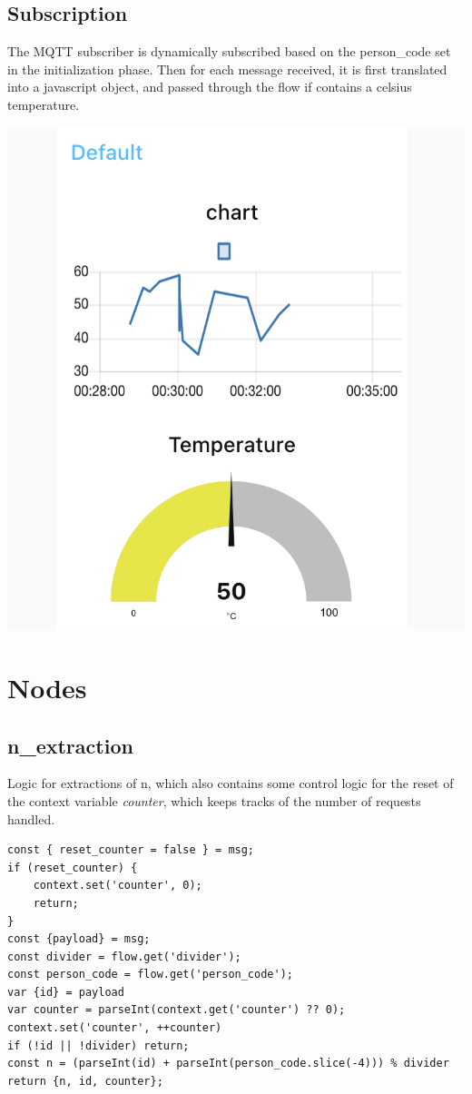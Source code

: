 \documentclass[12pt,a4paper]{article}
\begin{document}
\subsection*{Subscription}
The MQTT subscriber is dynamically subscribed based on the person\_code set in the initialization phase.
Then for each message received, it is first translated into a javascript object, and passed through the 
flow if contains a celsius temperature.

\begin{center}
    \includegraphics*[scale = 0.6]{images/chart.png}
\end{center}



\section*{Nodes}
\subsection*{n\_extraction}
Logic for extractions of n, which also contains some control logic for the reset of the context variable \textit{counter}, which keeps tracks
of the number of requests handled.
\begin{verbatim}
const { reset_counter = false } = msg;
if (reset_counter) {
    context.set('counter', 0);
    return;
}
const {payload} = msg;
const divider = flow.get('divider');
const person_code = flow.get('person_code');
var {id} = payload
var counter = parseInt(context.get('counter') ?? 0);
context.set('counter', ++counter)
if (!id || !divider) return;
const n = (parseInt(id) + parseInt(person_code.slice(-4))) % divider
return {n, id, counter};
\end{verbatim}
\end{document}
